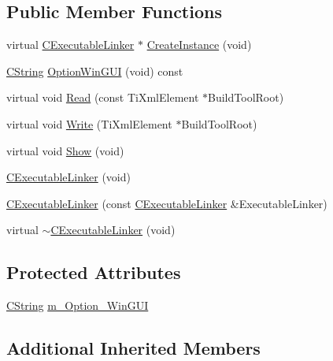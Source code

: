 \subsection*{Public Member Functions}
\begin{DoxyCompactItemize}
\item 
virtual \hyperlink{classCExecutableLinker}{C\-Executable\-Linker} $\ast$ \hyperlink{classCExecutableLinker_a457b823b737b0a78285d5ede77df827c}{Create\-Instance} (void)
\item 
\hyperlink{classCString}{C\-String} \hyperlink{classCExecutableLinker_aeb465eef80267304b011425fa9c242a4}{Option\-Win\-G\-U\-I} (void) const 
\item 
virtual void \hyperlink{classCExecutableLinker_a181ea374618a85985db14f468dc63023}{Read} (const Ti\-Xml\-Element $\ast$Build\-Tool\-Root)
\item 
virtual void \hyperlink{classCExecutableLinker_a6124deba72724510423c17963f960578}{Write} (Ti\-Xml\-Element $\ast$Build\-Tool\-Root)
\item 
virtual void \hyperlink{classCExecutableLinker_a01fa91b454c4cc4d154a26f0ab8da467}{Show} (void)
\item 
\hyperlink{classCExecutableLinker_a12713b324a534deaf474afa0732e11e5}{C\-Executable\-Linker} (void)
\item 
\hyperlink{classCExecutableLinker_aea030dc919cbc3f4ce2bce840471d927}{C\-Executable\-Linker} (const \hyperlink{classCExecutableLinker}{C\-Executable\-Linker} \&Executable\-Linker)
\item 
virtual \hyperlink{classCExecutableLinker_a5418dd890762573a7b9273f3bbdc3ef7}{$\sim$\-C\-Executable\-Linker} (void)
\end{DoxyCompactItemize}
\subsection*{Protected Attributes}
\begin{DoxyCompactItemize}
\item 
\hyperlink{classCString}{C\-String} \hyperlink{classCExecutableLinker_adff4da821e3b71b39b84f5ea5d183f87}{m\-\_\-\-Option\-\_\-\-Win\-G\-U\-I}
\end{DoxyCompactItemize}
\subsection*{Additional Inherited Members}



